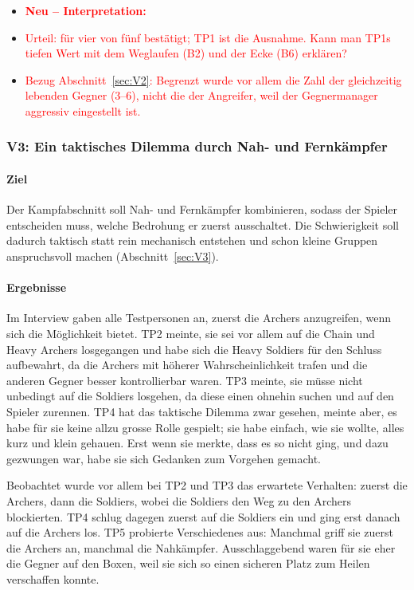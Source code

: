 \documentclass[../Main.tex]{subfiles}
\begin{document}
\begin{itemize}[leftmargin=1.5cm]
    \item \textcolor{red}{\textbf{Neu -- Interpretation:}}
    \item \textcolor{red}{Urteil: für vier von fünf bestätigt; TP1 ist die Ausnahme. Kann man TP1s tiefen Wert mit dem Weglaufen (B2) und der Ecke (B6) erklären?}
    \item \textcolor{red}{Bezug Abschnitt~\ref{sec:V2}: Begrenzt wurde vor allem die Zahl der gleichzeitig lebenden Gegner (3--6), nicht die der Angreifer, weil der Gegnermanager aggressiv eingestellt ist.}
\end{itemize}

\subsubsection{V3: Ein taktisches Dilemma durch Nah- und Fernkämpfer}

\paragraph{Ziel}
Der Kampfabschnitt soll Nah- und Fernkämpfer kombinieren, sodass der Spieler entscheiden muss, welche Bedrohung er zuerst ausschaltet. Die Schwierigkeit soll dadurch taktisch statt rein mechanisch entstehen und schon kleine Gruppen anspruchsvoll machen (Abschnitt~\ref{sec:V3}).

\paragraph{Ergebnisse}
Im Interview gaben alle Testpersonen an, zuerst die Archers anzugreifen, wenn sich die Möglichkeit bietet. TP2 meinte, sie sei vor allem auf die Chain und Heavy Archers losgegangen und habe sich die Heavy Soldiers für den Schluss aufbewahrt, da die Archers mit höherer Wahrscheinlichkeit trafen und die anderen Gegner besser kontrollierbar waren. TP3 meinte, sie müsse nicht unbedingt auf die Soldiers losgehen, da diese einen ohnehin suchen und auf den Spieler zurennen. TP4 hat das taktische Dilemma zwar gesehen, meinte aber, es habe für sie keine allzu grosse Rolle gespielt; sie habe einfach, wie sie wollte, alles kurz und klein gehauen. Erst wenn sie merkte, dass es so nicht ging, und dazu gezwungen war, habe sie sich Gedanken zum Vorgehen gemacht.

Beobachtet wurde vor allem bei TP2 und TP3 das erwartete Verhalten: zuerst die Archers, dann die Soldiers, wobei die Soldiers den Weg zu den Archers blockierten. TP4 schlug dagegen zuerst auf die Soldiers ein und ging erst danach auf die Archers los. TP5 probierte Verschiedenes aus: Manchmal griff sie zuerst die Archers an, manchmal die Nahkämpfer. Ausschlaggebend waren für sie eher die Gegner auf den Boxen, weil sie sich so einen sicheren Platz zum Heilen verschaffen konnte.
\end{document}
